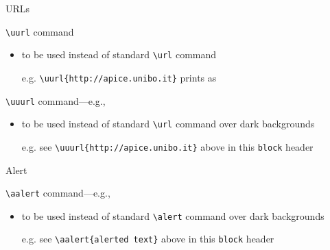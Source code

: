\documentclass[presentation]{beamer}\mode<presentation>{\usetheme{AMSBolognaFC}}
\begin{document}
	\begin{frame}[c,fragile]{URLs}
		\begin{block}{\texttt{\textbackslash{}uurl} command}
			\begin{itemize}
				\item to be used instead of standard \texttt{\textbackslash{}url} command
				\item[e.g.] \verb|| prints as \uurl{http://apice.unibo.it}
			\end{itemize}
		\end{block}
		\begin{block}{\texttt{\textbackslash{}uuurl} command---e.g., }
			\begin{itemize}
				\item to be used instead of standard \texttt{\textbackslash{}url} command over dark backgrounds
				\item[e.g.] see \verb|\uuurl{http://apice.unibo.it}| above in this \texttt{block} header
			\end{itemize}
		\end{block}
	\end{frame}
	
	\begin{frame}[c,fragile]{Alert}
		\begin{block}{\texttt{\textbackslash{}aalert} command---e.g., }
			\begin{itemize}
				\item to be used instead of standard \texttt{\textbackslash{}alert} command over dark backgrounds
				\item[e.g.] see \verb|\aalert{alerted text}| above in this \texttt{block} header
			\end{itemize}
		\end{block}
	\end{frame}
	
	
	\section*{}
	
	\frame{\titlepage}
	
\end{document}
